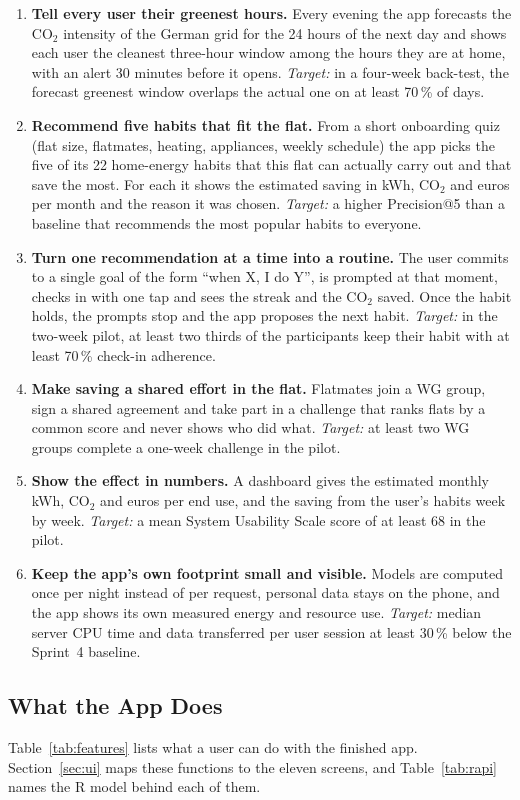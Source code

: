 \documentclass[conference]{IEEEtran}
\newcommand{\COtwo}{CO$_2$}
\begin{document}
\begin{enumerate}
\item \textbf{Tell every user their greenest hours.} Every evening the app forecasts the \COtwo{} intensity of the German grid for the 24 hours of the next day and shows each user the cleanest three-hour window among the hours they are at home, with an alert 30 minutes before it opens. \emph{Target:} in a four-week back-test, the forecast greenest window overlaps the actual one on at least 70\,\% of days.
\item \textbf{Recommend five habits that fit the flat.} From a short onboarding quiz (flat size, flatmates, heating, appliances, weekly schedule) the app picks the five of its 22 home-energy habits that this flat can actually carry out and that save the most. For each it shows the estimated saving in kWh, \COtwo{} and euros per month and the reason it was chosen. \emph{Target:} a higher Precision@5 than a baseline that recommends the most popular habits to everyone.
\item \textbf{Turn one recommendation at a time into a routine.} The user commits to a single goal of the form ``when X, I do Y'', is prompted at that moment, checks in with one tap and sees the streak and the \COtwo{} saved. Once the habit holds, the prompts stop and the app proposes the next habit. \emph{Target:} in the two-week pilot, at least two thirds of the participants keep their habit with at least 70\,\% check-in adherence.
\item \textbf{Make saving a shared effort in the flat.} Flatmates join a WG group, sign a shared agreement and take part in a challenge that ranks flats by a common score and never shows who did what. \emph{Target:} at least two WG groups complete a one-week challenge in the pilot.
\item \textbf{Show the effect in numbers.} A dashboard gives the estimated monthly kWh, \COtwo{} and euros per end use, and the saving from the user's habits week by week. \emph{Target:} a mean System Usability Scale score of at least 68 in the pilot.
\item \textbf{Keep the app's own footprint small and visible.} Models are computed once per night instead of per request, personal data stays on the phone, and the app shows its own measured energy and resource use. \emph{Target:} median server CPU time and data transferred per user session at least 30\,\% below the Sprint~4 baseline.
\end{enumerate}

\subsection{What the App Does}
\label{sec:features}
Table~\ref{tab:features} lists what a user can do with the finished app. Section~\ref{sec:ui} maps these functions to the eleven screens, and Table~\ref{tab:rapi} names the R model behind each of them.
\end{document}
